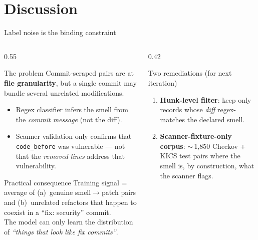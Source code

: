 \documentclass[aspectratio=169, 10pt]{beamer}
\begin{document}
\section{Discussion}

\begin{frame}{Label noise is the binding constraint}
  \begin{columns}[T]
    \begin{column}{0.55\textwidth}
      \begin{alertblock}{The problem}
        \scriptsize
        Commit-scraped pairs are at \textbf{file granularity}, but a
        single commit may bundle several unrelated modifications.
        \begin{itemize}
          \item Regex classifier infers the smell from the
                \emph{commit message} (not the diff).
          \item Scanner validation only confirms that \texttt{code\_before}
                was vulnerable --- not that the \emph{removed lines}
                address that vulnerability.
        \end{itemize}
      \end{alertblock}
      \begin{block}{Practical consequence}
        \scriptsize
        Training signal = average of (a)~genuine smell$\to$patch pairs
        and (b)~unrelated refactors that happen to coexist in a
        ``fix: security'' commit.\\
        The model can only learn the distribution of
        \emph{``things that look like fix commits''}.
      \end{block}
    \end{column}
    \begin{column}{0.42\textwidth}
      \begin{exampleblock}{Two remediations (for next iteration)}
        \scriptsize
        \begin{enumerate}
          \item \textbf{Hunk-level filter}: keep only records whose
                \emph{diff} regex-matches the declared smell.
          \item \textbf{Scanner-fixture-only corpus}: $\sim$\,1{,}850
                Checkov + KICS test pairs where the smell is,
                by construction, what the scanner flags.
        \end{enumerate}
      \end{exampleblock}
    \end{column}
  \end{columns}
\end{frame}
\end{document}
